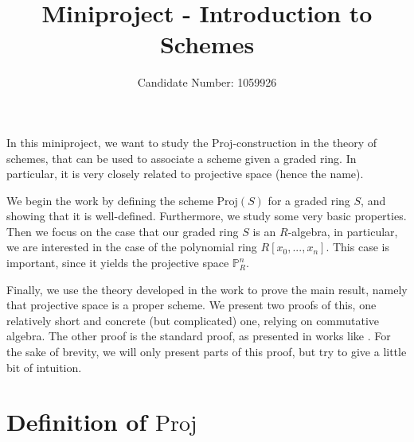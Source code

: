 \documentclass{scrartcl}
\title{Miniproject - Introduction to Schemes}
\author{Candidate Number: 1059926}
\renewcommand{\P}{\mathbb{P}}
\newcommand{\Proj}{\mathrm{Proj}}
\theoremstyle{definition}
\begin{document}
\maketitle

In this miniproject, we want to study the $\Proj$-construction in the theory of schemes, that can be used to associate a scheme given a graded ring.
In particular, it is very closely related to projective space (hence the name).

We begin the work by defining the scheme $\Proj(S)$ for a graded ring $S$, and showing that it is well-defined.
Furthermore, we study some very basic properties.
Then we focus on the case that our graded ring $S$ is an $R$-algebra, in particular, we are interested in the case of the polynomial ring $R[x_0, ..., x_n]$.
This case is important, since it yields the projective space $\P_R^n$.

Finally, we use the theory developed in the work to prove the main result, namely that projective space is a proper scheme.
We present two proofs of this, one relatively short and concrete (but complicated) one, relying on commutative algebra.
The other proof is the standard proof, as presented in works like \cite{hartshorne}.
For the sake of brevity, we will only present parts of this proof, but try to give a little bit of intuition.

\section{Definition of $\Proj$}
\end{document}
